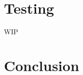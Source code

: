 \documentclass[systeme,french,english]{compas2022}
\begin{document}
\section{Testing}

WIP










\section{Conclusion}


\end{document}
